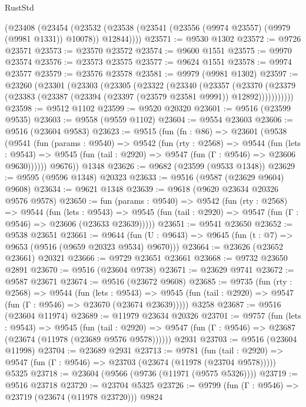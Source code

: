 \begin{lexlean}{RustStd}
\begin{coremodule}
    (@23408
      (@23454
        (@23532 (@23538 (@23541 (@23556 (@9974 @23557) (@9979 (@9981 @1331)) @10078)) @12844))))
@23571 := @9530 @1302
@23572 := @9726 @23571
@23573 := @23570 @23572
@23574 := @9600 @1551
@23575 := @9970 @23574
@23576 := @23573 @23575
@23577 := @9624 @1551
@23578 := @9974 @23577
@23579 := @23576 @23578
@23581 := @9979 (@9981 @1302)
@23597 := @23260
    (@23301
      (@23303
        (@23305
          (@23322
            (@23340
              (@23357
                (@23370
                  (@23379 (@23383 (@23387 (@23394 (@23397 (@23579 @23581 @9991)) @12892)))))))))))
@23598 := @9512 @1102
@23599 := @9520 @20320
@23601 := @9516 (@23599 @9535)
@23603 := @9558 (@9559 @1102)
@23604 := @9554 @23603
@23606 := @9516 (@23604 @9583)
@23623 := @9515
    (fun (fn : @86) =>
    @23601
      (@9538
        (@9541
          (fun (params : @9540) =>
          @9542
            (fun (rty : @2568) =>
            @9544
              (fun (lets : @9543) =>
              @9545 (fun (tail : @2920) => @9547 (fun (Γ : @9546) => @23606 @9630))))))
        @9676))
    @1348
@23626 := @9682 (@23599 (@9533 @1348))
@23629 := @9595 (@9596 @1348) @20323
@23633 := @9516 (@9587 (@23629 @9604) @9608)
@23634 := @9621 @1348
@23639 := @9618 (@9620 @23634 @20326 @9576 @9578)
@23650 := fun (params : @9540) =>
  @9542
    (fun (rty : @2568) =>
    @9544
      (fun (lets : @9543) =>
      @9545 (fun (tail : @2920) => @9547 (fun (Γ : @9546) => @23606 (@23633 @23639)))))
@23651 := @9541 @23650
@23652 := @9538 @23651
@23661 := @9644
    (fun (U : @9643) => @9645 (fun (t : @7) => @9653 (@9516 (@9659 @20323 @9534) @9670)))
@23664 := @23626 (@23652 @23661) @20321
@23666 := @9729 @23651 @23661
@23668 := @9732 @23650 @2891
@23670 := @9516 (@23604 @9738)
@23671 := @23629 @9741
@23672 := @9587 @23671
@23674 := @9516 (@23672 @9608)
@23685 := @9735
    (fun (rty : @2568) =>
    @9544
      (fun (lets : @9543) =>
      @9545 (fun (tail : @2920) => @9547 (fun (Γ : @9546) => @23670 (@23674 @23639)))))
    @3258
@23687 := @9516 (@23604 @11974)
@23689 := @11979 @23634 @20326
@23701 := @9757
    (fun (lets : @9543) =>
    @9545
      (fun (tail : @2920) =>
      @9547 (fun (Γ : @9546) => @23687 (@23674 (@11978 (@23689 @9576 @9578))))))
    @2931
@23703 := @9516 (@23604 @11998)
@23704 := @23689 @2931
@23713 := @9781
    (fun (tail : @2920) => @9547 (fun (Γ : @9546) => @23703 (@23674 (@11978 (@23704 @9578)))))
    @5325
@23718 := @23604 (@9566 (@9736 (@11971 (@9575 @5326))))
@23719 := @9516 @23718
@23720 := @23704 @5325
@23726 := @9799 (fun (Γ : @9546) => @23719 (@23674 (@11978 @23720))) @9824

\end{coremodule}
\end{lexlean}
